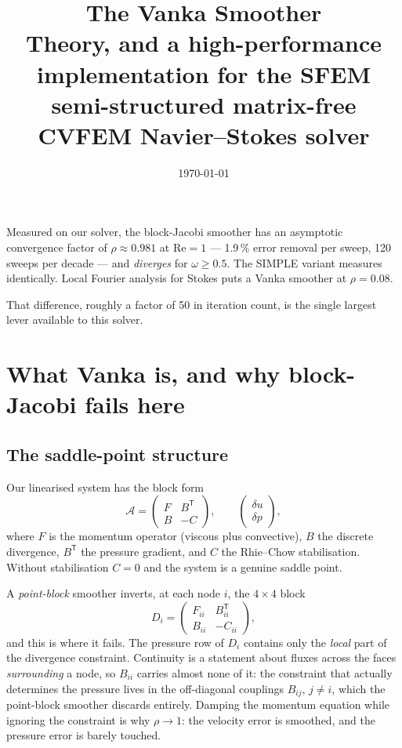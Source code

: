 \documentclass[11pt,a4paper]{article}
\title{\bfseries The Vanka Smoother\\
\large Theory, and a high-performance implementation for the SFEM\\
semi-structured matrix-free CVFEM Navier--Stokes solver}
\date{\today}
\newcommand{\Rey}{\mathrm{Re}}
\begin{document}
\maketitle

\begin{tcolorbox}[colback=red!4,colframe=red!55!black,title=\bfseries Why this document exists]
Measured on our solver, the block-Jacobi smoother has an asymptotic convergence factor of
$\rho \approx 0.981$ at $\Rey = 1$ --- 1.9\,\% error removal per sweep, 120 sweeps per decade
--- and \emph{diverges} for $\omega \ge 0.5$. The SIMPLE variant measures identically. Local
Fourier analysis for Stokes puts a Vanka smoother at $\rho = 0.08$.

That difference, roughly a factor of 50 in iteration count, is the single largest lever
available to this solver.
\end{tcolorbox}

\section{What Vanka is, and why block-Jacobi fails here}

\subsection{The saddle-point structure}
Our linearised system has the block form
\begin{equation}
\mathcal{A} =
\begin{pmatrix} F & B^{\mathsf T} \\ B & -C \end{pmatrix},
\qquad
\begin{pmatrix} \delta u \\ \delta p \end{pmatrix},
\end{equation}
where $F$ is the momentum operator (viscous plus convective), $B$ the discrete divergence,
$B^{\mathsf T}$ the pressure gradient, and $C$ the Rhie--Chow stabilisation. Without
stabilisation $C = 0$ and the system is a genuine saddle point.

A \emph{point-block} smoother inverts, at each node $i$, the $4\times4$ block
\begin{equation}
D_i =
\begin{pmatrix}
F_{ii} & B^{\mathsf T}_{ii} \\ B_{ii} & -C_{ii}
\end{pmatrix},
\end{equation}
and this is where it fails. The pressure row of $D_i$ contains only the \emph{local} part of
the divergence constraint. Continuity is a statement about fluxes across the faces
\emph{surrounding} a node, so $B_{ii}$ carries almost none of it: the constraint that actually
determines the pressure lives in the off-diagonal couplings $B_{ij}$, $j \ne i$, which the
point-block smoother discards entirely. Damping the momentum equation while ignoring the
constraint is why $\rho \to 1$: the velocity error is smoothed, and the pressure error is
barely touched.
\end{document}
